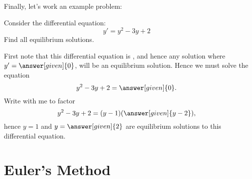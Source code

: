 \documentclass{ximera}
\begin{document}
Finally, let's work an example problem:

\begin{example}
  Consider the differential equation:
  \[
  y' = y^2 - 3y+2
  \]
  Find all equilibrium solutions.
  \begin{explanation}
    First note that this differential equation is
    ,
    and hence any solution where $y'=\answer[given]{0}$, will be an
    equilibrium solution. Hence we must solve the equation
    \[
    y^2 -3y + 2 = \answer[given]{0}.
    \]
    Write with me to factor
    \[
    y^2 -3y + 2 = (y-1)(\answer[given]{y-2}),
    \]
    hence $y= 1$ and $y=\answer[given]{2}$ are equilibrium solutions
    to this differential equation.
  \end{explanation}
\end{example}


























\section{Euler's Method}
\end{document}
